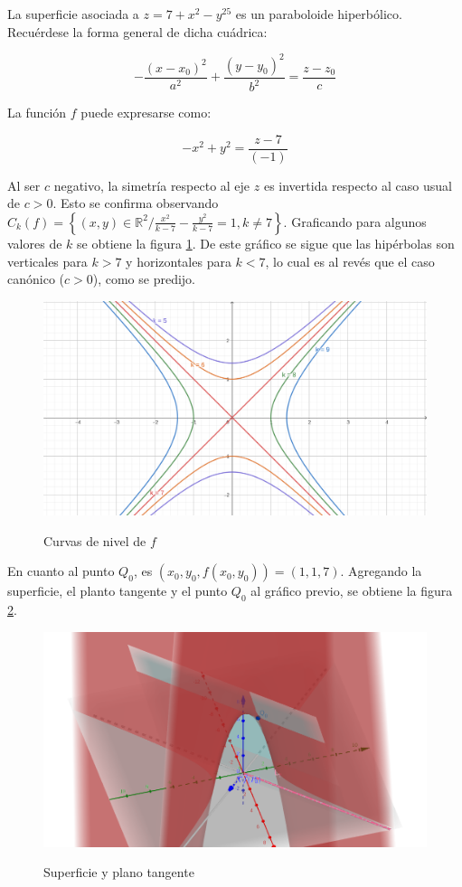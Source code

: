 \documentclass{article}
\renewcommand{\Bbb}{\mathbb}
\begin{document}
La superficie asociada a $z = 7 + x^2 - y^25$ es un paraboloide hiperbólico. Recuérdese la forma general de dicha cuádrica:

\begin{equation}
-\frac{(x-x_0)^2}{a^2} + \frac{(y-y_0)^2}{b^2} = \frac{z-z_0}{c}
\end{equation}

La función $f$ puede expresarse como:

\begin{equation}
-x^2 + y^2 = \frac{z-7}{(-1)}
\end{equation}

Al ser $c$ negativo, la simetría respecto al eje $z$ es invertida respecto al caso usual de $c > 0$. Esto se confirma observando  $C_k(f) = \left\{ (x,y) \in \Bbb R^2 / \frac{x^2}{k-7} -\frac{y^2}{k-7} = 1, k \neq 7 \right\}$. Graficando para algunos valores de $k$ se obtiene la figura \ref{fig:1-e-3-1}. De este gráfico se sigue que las hipérbolas son verticales para $k > 7$ y horizontales para $k < 7$, lo cual es al revés que el caso canónico ($c > 0$), como se predijo.

\begin{figure}[ht]
\caption{Curvas de nivel de $f$}
\includegraphics[scale=1.25]{img/ejercicios/3/1-e-3-1.png} 
\centering
\label{fig:1-e-3-1}
\end{figure}

En cuanto al punto $Q_0$, es $(x_0, y_0, f(x_0, y_0)) = (1, 1, 7)$. Agregando la superficie, el planto tangente y el punto $Q_0$ al gráfico previo, se obtiene la figura \ref{fig:1-e-3-2}.

\begin{figure}[ht]
\caption{Superficie y plano tangente}
\includegraphics[scale=0.3]{img/ejercicios/3/1-e-3-2.png} 
\centering
\label{fig:1-e-3-2}
\end{figure}
\end{document}
